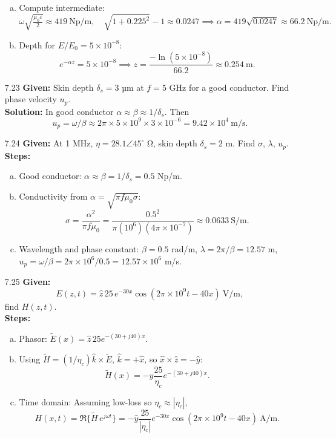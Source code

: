 \begin{enumerate}
\begin{enumerate}[(a)]
  \item Compute intermediate:
  \[\omega\sqrt{\tfrac{\mu_0\varepsilon}{2}}\approx419~\mathrm{Np/m},\quad
    \sqrt{1+0.225^2}-1\approx0.0247
    \implies\alpha=419\sqrt{0.0247}\approx66.2~\mathrm{Np/m}.\]

  \item Depth for $E/E_0=5\times10^{-8}$:
  \[e^{-\alpha z}=5\times10^{-8}\implies z=\frac{-\ln(5\times10^{-8})}{66.2}\approx0.254~\mathrm m.\]
\end{enumerate}

\item[7.23] \textbf{Given:} Skin depth $\delta_s=3$ µm at $f=5$ GHz for a good conductor.  Find phase velocity $u_p$.
\\
\textbf{Solution:} In good conductor $\alpha\approx\beta\approx1/\delta_s$.  Then
\[u_p=\omega/\beta\approx2\pi\times5\times10^9\times3\times10^{-6}=9.42\times10^4~\mathrm{m/s}.\]

\item[7.24] \textbf{Given:} At 1 MHz, $\eta=28.1\angle45^\circ$ Ω, skin depth $\delta_s=2$ m.  Find $\sigma$, $\lambda$, $u_p$.
\\
\textbf{Steps:}
\begin{enumerate}[(a)]
  \item Good conductor: $\alpha\approx\beta=1/\delta_s=0.5$ Np/m.

  \item Conductivity from $\alpha=\sqrt{\pi f\mu_0\sigma}$:
  \[\sigma=\frac{\alpha^2}{\pi f\mu_0}=\frac{0.5^2}{\pi(10^6)(4\pi\times10^{-7})}\approx0.0633~\mathrm{S/m}.\]

  \item Wavelength and phase constant: $\beta=0.5$ rad/m, $\lambda=2\pi/\beta=12.57$ m, $u_p=\omega/\beta=2\pi\times10^6/0.5=12.57\times10^6$ m/s.
\end{enumerate}

\item[7.25] \textbf{Given:}
\[E(z,t)=\hat z\,25\,e^{-30x}\cos(2\pi\times10^9t-40x)~\mathrm{V/m},\]
find $H(z,t)$.
\\
\textbf{Steps:}
\begin{enumerate}[(a)]
  \item Phasor: $\tilde E(x)=\hat z\,25e^{-(30+j40)x}$.  
  \item Using $\tilde H=(1/\eta_c)\hat k\times\tilde E$, $\hat k=+\hat x$, so $\hat x\times\hat z=-\hat y$:
  \[\tilde H(x)=-\hat y\frac{25}{\eta_c}e^{-(30+j40)x}.\]

  \item Time domain: Assuming low-loss so $\eta_c\approx|\eta_c|$,
  \[H(x,t)=\Re\{\tilde H\,e^{j\omega t}\}
    =-\hat y\frac{25}{|\eta_c|}e^{-30x}\cos(2\pi\times10^9t-40x)~\mathrm{A/m}.\]
\end{enumerate}

\end{enumerate}

